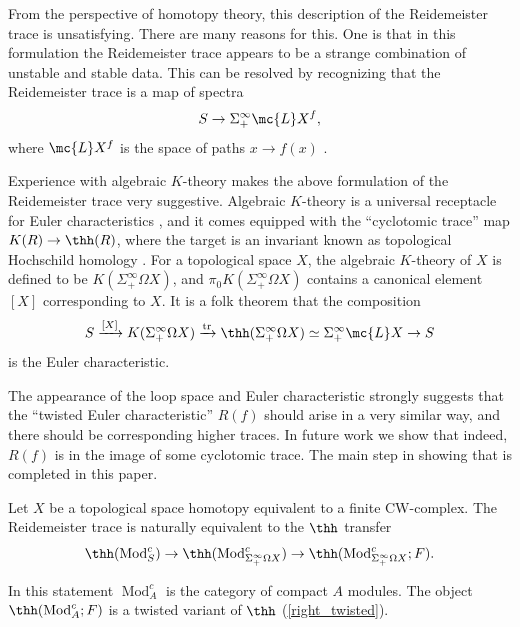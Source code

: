 \documentclass[11pt]{amsart}
\DeclareMathOperator{\tr}{tr}
\begin{document}
From the perspective of homotopy theory,  this description of the Reidemeister trace is unsatisfying.  There are many reasons for this.  One is that in this formulation the Reidemeister trace appears to be a 
strange combination of unstable and stable data. 
This can be resolved by recognizing that  the Reidemeister trace 
is a map of spectra 
\[
  S \to \Sigma^\infty_+ \mc{L} X^f,
\] 
where $\mc{L} X^f$ is the space of paths $x \to f(x)$ \cite{p:thesis, p:coincidence}. 

Experience with algebraic $K$-theory makes the above formulation of the Reidemeister trace very suggestive. Algebraic $K$-theory is a universal receptacle for Euler characteristics \cite{waldhausen, barwick, blumberg_gepner_tabuada}, and it comes equipped with the ``cyclotomic trace'' map $K(R) \to \thh (R)$, where the target is an invariant known as topological Hochschild homology \cite{bokstedt_hsiang_madsen}. For a topological space $X$, the algebraic $K$-theory of $X$ is defined to be $K(\Sigma^\infty_+ \Omega X)$, and $\pi_0 K(\Sigma^\infty_+ \Omega X)$ contains a canonical element $[X]$ corresponding to $X$. It is a folk theorem that the composition
 \begin{equation*}
  S \xrightarrow{[X]} K(\Sigma^\infty_+ \Omega X) \xrightarrow{\tr} \thh (\Sigma^\infty_+ \Omega X) \simeq \Sigma^\infty_+ \mc{L} X \to S 
  \end{equation*} 
is the Euler characteristic. 

The appearance of the loop space and Euler characteristic strongly suggests that the ``twisted Euler characteristic'' $R(f)$ should arise in a very similar way, and there should be corresponding higher traces. In future work we show that indeed, $R(f)$ is in the image of some cyclotomic trace. The main step in showing that is completed in this paper.

\begin{thm}\label{thm:lm_generalization}
  Let $X$ be a topological space homotopy equivalent to a finite CW-complex. The Reidemeister trace is naturally equivalent to the $\thh$ transfer
  \[
    \thh(\operatorname{Mod}^c_S) \to  \thh(\operatorname{Mod}^c_{\Sigma^\infty_+ \Omega X})\to  \thh(\operatorname{Mod}^c_{\Sigma^\infty_+ \Omega X}; F).
  \]
\end{thm}


In this statement $\operatorname{Mod}^c_A$ is the category of compact $A$ modules. The object $\thh(\operatorname{Mod}^c_A; F)$ is a twisted variant of $\thh$ (\cref{right_twisted}). 
\end{document}
